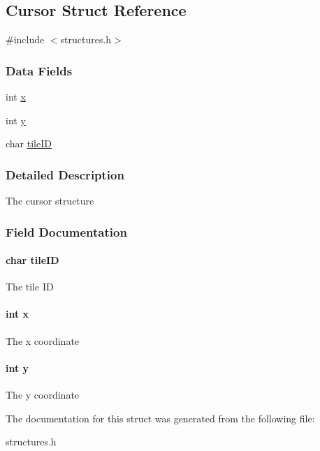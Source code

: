 \hypertarget{struct_cursor}{\subsection{Cursor Struct Reference}
\label{struct_cursor}
}


{\ttfamily \#include $<$structures.\-h$>$}

\subsubsection*{Data Fields}
\begin{DoxyCompactItemize}
\item 
int \hyperlink{struct_cursor_a6150e0515f7202e2fb518f7206ed97dc}{x}
\item 
int \hyperlink{struct_cursor_a0a2f84ed7838f07779ae24c5a9086d33}{y}
\item 
char \hyperlink{struct_cursor_a3fd2d5bff52de558bb2a5aec261d6ee2}{tile\-I\-D}
\end{DoxyCompactItemize}


\subsubsection{Detailed Description}
The cursor structure 

\subsubsection{Field Documentation}
\hypertarget{struct_cursor_a3fd2d5bff52de558bb2a5aec261d6ee2}{
\paragraph[{tile\-I\-D}]{\setlength{\rightskip}{0pt plus 5cm}char tile\-I\-D}}\label{struct_cursor_a3fd2d5bff52de558bb2a5aec261d6ee2}
The tile I\-D \hypertarget{struct_cursor_a6150e0515f7202e2fb518f7206ed97dc}{
\paragraph[{x}]{\setlength{\rightskip}{0pt plus 5cm}int x}}\label{struct_cursor_a6150e0515f7202e2fb518f7206ed97dc}
The x coordinate \hypertarget{struct_cursor_a0a2f84ed7838f07779ae24c5a9086d33}{
\paragraph[{y}]{\setlength{\rightskip}{0pt plus 5cm}int y}}\label{struct_cursor_a0a2f84ed7838f07779ae24c5a9086d33}
The y coordinate 

The documentation for this struct was generated from the following file\-:\begin{DoxyCompactItemize}
\item 
structures.\-h\end{DoxyCompactItemize}
